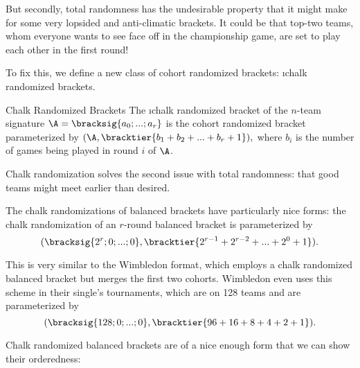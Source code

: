 {    But secondly, total randomness has the undesirable property that it might make for some very lopsided and anti-climatic brackets. It could be that top-two teams, whom everyone wants to see face off in the championship game, are set to play each other in the first round!

    To fix this, we define a new class of cohort randomized brackets: \i{chalk randomized brackets}.

    \begin{definition}{Chalk Randomized Brackets}{}
        The \i{chalk randomized bracket} of the $n$-team signature $\A = \bracksig{a_0; ...; a_r}$ is the cohort randomized bracket parameterized by $(\A, \bracktier{b_1 + b_2 + ... + b_r + 1}),$ where $b_i$ is the number of games being played in round $i$ of $\A$.
    \end{definition}

    Chalk randomization solves the second issue with total randomness: that good teams might meet earlier than desired.


    The chalk randomizations of balanced brackets have particularly nice forms: the chalk randomization of an $r$-round balanced bracket is parameterized by $$(\bracksig{2^r; 0; ...; 0}, \bracktier{2^{r-1} + 2^{r-2} + ... + 2^{0} + 1}).$$

    This is very similar to the Wimbledon format, which employs a chalk randomized balanced bracket but merges the first two cohorts. Wimbledon even uses this scheme in their single's tournaments, which are on 128 teams and are parameterized by $$(\bracksig{128; 0; ...; 0}, \bracktier{96 + 16 + 8 + 4 + 2 + 1}).$$

    Chalk randomized balanced brackets are of a nice enough form that we can show their orderedness:

}
